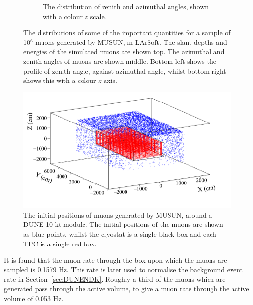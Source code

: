 \begin{figure}
\begin{subfigure}{0.45\textwidth}
    \caption{The distribution of zenith and azimuthal angles, shown with a colour $z$ scale.}
  \end{subfigure}
  \caption[The distributions of some of the important quantities for a sample of 10$^6$ muons generated by MUSUN, in LArSoft]
          {The distributions of some of the important quantities for a sample of 10$^6$ muons generated by MUSUN, in LArSoft. The slant depths and energies of the simulated muons are shown top. The azimuthal and zenith angles of muons are shown middle. Bottom left shows the profile of zenith angle, against azimuthal angle, whilst bottom right shows this with a colour $z$ axis.}
  \label{fig:MUSUNIncorp}
\end{figure}

\begin{figure}
  \centering
  \includegraphics[width=\textwidth]{MuonPosCan}
  \caption[The initial positions of muons generated by MUSUN, around a DUNE 10 kt module]
          {The initial positions of muons generated by MUSUN, around a DUNE 10 kt module. The initial positions of the muons are shown as blue points, whilst the cryostat is a single black box and each TPC is a single red box.}
  \label{fig:10ktPos}
\end{figure}

It is found that the muon rate through the box upon which the muons are sampled is 0.1579 Hz. This rate is later used to normalise the background event rate in Section~\ref{sec:DUNENDK}. Roughly a third of the muons which are generated pass through the active volume, to give a muon rate through the active volume of 0.053 Hz. \\ 


